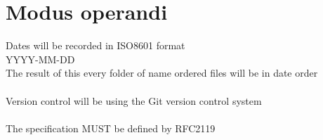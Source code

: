 \section{Modus operandi}
Dates will be recorded in \gls{ISO8601} format\\
YYYY-MM-DD\\
The result of this every folder of name ordered files will be in date order\\
\\
Version control will be using the \gls{Git} version control system\\
\\
The specification MUST be defined by \gls{RFC2119}
